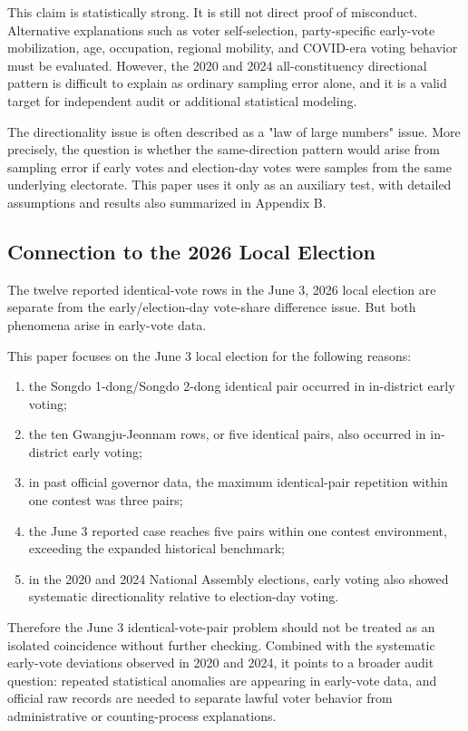 \documentclass[preprint]{IEIE}
\begin{document}
This claim is statistically strong. It is still not direct proof of misconduct. Alternative explanations such as voter self-selection, party-specific early-vote mobilization, age, occupation, regional mobility, and COVID-era voting behavior must be evaluated. However, the 2020 and 2024 all-constituency directional pattern is difficult to explain as ordinary sampling error alone, and it is a valid target for independent audit or additional statistical modeling.

The directionality issue is often described as a "law of large numbers" issue. More precisely, the question is whether the same-direction pattern would arise from sampling error if early votes and election-day votes were samples from the same underlying electorate. This paper uses it only as an auxiliary test, with detailed assumptions and results also summarized in Appendix B.

\subsection{Connection to the 2026 Local Election}

The twelve reported identical-vote rows in the June 3, 2026 local election are separate from the early/election-day vote-share difference issue. But both phenomena arise in early-vote data.

This paper focuses on the June 3 local election for the following reasons:

\begin{enumerate}
\item the Songdo 1-dong/Songdo 2-dong identical pair occurred in in-district early voting;
\item the ten Gwangju-Jeonnam rows, or five identical pairs, also occurred in in-district early voting;
\item in past official governor data, the maximum identical-pair repetition within one contest was three pairs;
\item the June 3 reported case reaches five pairs within one contest environment, exceeding the expanded historical benchmark;
\item in the 2020 and 2024 National Assembly elections, early voting also showed systematic directionality relative to election-day voting.
\end{enumerate}

Therefore the June 3 identical-vote-pair problem should not be treated as an isolated coincidence without further checking. Combined with the systematic early-vote deviations observed in 2020 and 2024, it points to a broader audit question: repeated statistical anomalies are appearing in early-vote data, and official raw records are needed to separate lawful voter behavior from administrative or counting-process explanations.
\end{document}
